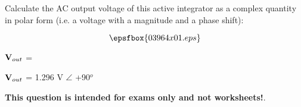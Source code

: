

Calculate the AC output voltage of this active integrator as a complex quantity in polar form (i.e. a voltage with a magnitude and a phase shift):

$$\epsfbox{03964x01.eps}$$

${\bf V}_{out}$ =







${\bf V}_{out}$ = 1.296 V $\angle$ +90$^{o}$







{\bf This question is intended for exams only and not worksheets!}.



